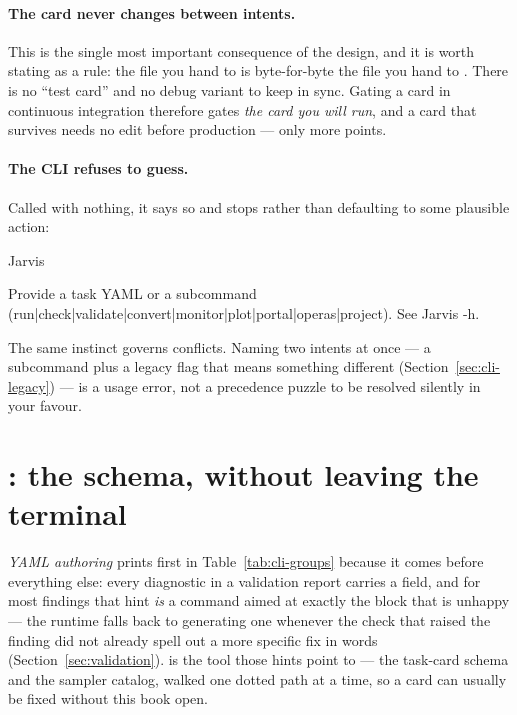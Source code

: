 \paragraph{The card never changes between intents.} This is the single most important
consequence of the design, and it is worth stating as a rule: the file you hand to
 is byte-for-byte the file you hand to . There is
no ``test card'' and no debug variant to keep in sync. Gating a card in continuous
integration therefore gates \emph{the card you will run}, and a card that survives
 needs no edit before production --- only more points.

\paragraph{The CLI refuses to guess.} Called with nothing, it says so and stops rather
than defaulting to some plausible action:

\begin{terminal}
\begin{jcmd}
Jarvis
\end{jcmd}
\termsep
\begin{jout}
Provide a task YAML or a subcommand
(run|check|validate|convert|monitor|plot|portal|operas|project). See Jarvis -h.
\end{jout}
\end{terminal}

The same instinct governs conflicts. Naming two intents at once --- a subcommand plus a
legacy flag that means something different (Section~\ref{sec:cli-legacy}) --- is a usage
error, not a precedence puzzle to be resolved silently in your favour.

\section{: the schema, without leaving the terminal}
\label{sec:cli-man}

\emph{YAML authoring} prints first in Table~\ref{tab:cli-groups} because it comes before
everything else: every diagnostic in a validation report carries a  field, and
for most findings that hint \emph{is} a  command aimed at exactly the
block that is unhappy --- the runtime falls back to generating one whenever the check
that raised the finding did not already spell out a more specific fix in words
(Section~\ref{sec:validation}).  is the tool those hints point to --- the
task-card schema and the sampler catalog, walked one dotted path at a time, so a card can
usually be fixed without this book open.

